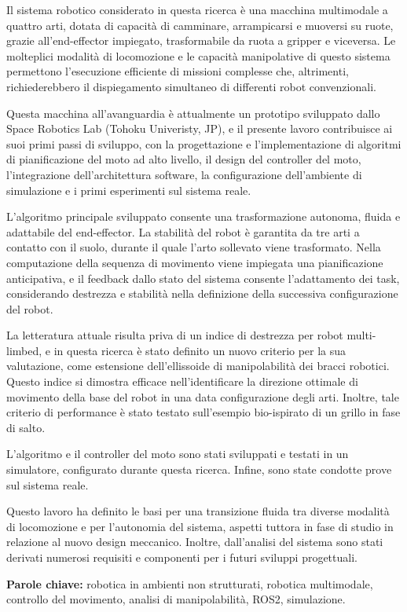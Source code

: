 Il sistema robotico considerato in questa ricerca è una macchina multimodale a quattro arti, dotata di capacità di camminare, arrampicarsi e muoversi su ruote, grazie all’end-effector impiegato, trasformabile da ruota a gripper e viceversa. Le molteplici modalità di locomozione e le capacità manipolative di questo sistema permettono l’esecuzione efficiente di missioni complesse che, altrimenti, richiederebbero il dispiegamento simultaneo di differenti robot convenzionali.

Questa macchina all’avanguardia è attualmente un prototipo sviluppato dallo Space Robotics Lab (Tohoku Univeristy, JP), e il presente lavoro contribuisce ai suoi primi passi di sviluppo, con la progettazione e l’implementazione di algoritmi di pianificazione del moto ad alto livello, il design del controller del moto, l’integrazione dell’architettura software, la configurazione dell’ambiente di simulazione e i primi esperimenti sul sistema reale.

L’algoritmo principale sviluppato consente una trasformazione autonoma, fluida e adattabile del end-effector. La stabilità del robot è garantita da tre arti a contatto con il suolo, durante il quale l’arto sollevato viene trasformato. 
Nella computazione della sequenza di movimento viene impiegata una pianificazione anticipativa, e il feedback dallo stato del sistema consente l’adattamento dei task, considerando destrezza e stabilità nella definizione della successiva configurazione del robot.

La letteratura attuale risulta priva di un indice di destrezza per robot multi-limbed, e in questa ricerca è stato definito un nuovo criterio per la sua valutazione, come estensione dell’ellissoide di manipolabilità dei bracci robotici. Questo indice si dimostra efficace nell’identificare la direzione ottimale di movimento della base del robot in una data configurazione degli arti. Inoltre, tale criterio di performance è stato testato sull’esempio bio-ispirato di un grillo in fase di salto.

L’algoritmo e il controller del moto sono stati sviluppati e testati in un simulatore, configurato durante questa ricerca. Infine, sono state condotte prove sul sistema reale.

Questo lavoro ha definito le basi per una transizione fluida tra diverse modalità di locomozione e per l’autonomia del sistema, aspetti tuttora in fase di studio in relazione al nuovo design meccanico. Inoltre, dall’analisi del sistema sono stati derivati numerosi requisiti e componenti per i futuri sviluppi progettuali.


\vspace{0.5em}
\noindent\textbf{Parole chiave:} robotica in ambienti non strutturati, robotica multimodale, controllo del movimento, analisi di manipolabilità, ROS2, simulazione.%